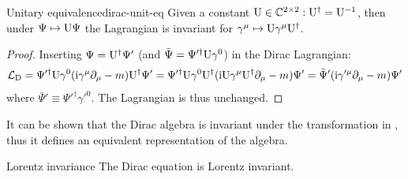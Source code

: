 \begin{proposition}{Unitary equivalence}{dirac-unit-eq}
  Given a constant $ \mathrm{U} \in \mathbb{C}^{2 \times 2} : \mathrm{U}^\dagger = \mathrm{U}^{-1} $, then under $ \Psi \mapsto \mathrm{U} \Psi $ the Lagrangian is invariant for $ \gamma^\mu \mapsto \mathrm{U} \gamma^\mu \mathrm{U}^\dagger $.
\end{proposition}

\begin{proofbox}
  \begin{proof}
    Inserting $ \Psi = \mathrm{U}^\dagger \Psi' $ (and $ \bar{\Psi} = \Psi'^\dagger \mathrm{U} \gamma^0 $) in the Dirac Lagrangian:
    \begin{equation*}
      \mathcal{L}_\text{D} = \Psi'^\dagger \mathrm{U} \gamma^0 (\mathrm{i} \gamma^\mu \partial_\mu - m) \mathrm{U}^\dagger \Psi' = \Psi'^\dagger \mathrm{U} \gamma^0 \mathrm{U}^\dagger (\mathrm{i} \mathrm{U} \gamma^\mu \mathrm{U}^\dagger \partial_\mu - m) \Psi' = \bar{\Psi}' (\mathrm{i} \gamma'^\mu \partial_\mu - m) \Psi'
    \end{equation*}
    where $ \bar{\Psi}' \equiv \Psi'^\dagger \gamma'^0 $. The Lagrangian is thus unchanged.
  \end{proof}
\end{proofbox}

It can be shown that the Dirac algebra is invariant under the transformation in , thus it defines an equivalent representation of the algebra.

\begin{proposition}{Lorentz invariance}{}
  The Dirac equation is Lorentz invariant.
\end{proposition}

